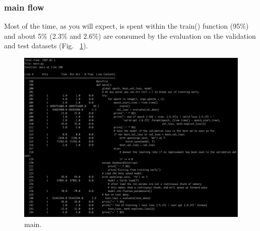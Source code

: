\documentclass[11pt]{article}
\newcommand{\0}{\mat{0}}
\begin{document}
\begin{itemize}
  \subsubsection*{main flow}
   Most of the time, as you will expect, is spent within the train() function (95\%) and  about 5\% (2.3\% and 2.6\%)  are consumed by the evaluation on the validation and test datasets (Fig. ~\ref{fig:main}).
   \begin{figure}[h!]
  	\centering
 	 \includegraphics[width=\linewidth]{main.png}
 	 \caption{main.}
 	 \label{fig:main}
   \end{figure}


\end{itemize}
\end{document}
